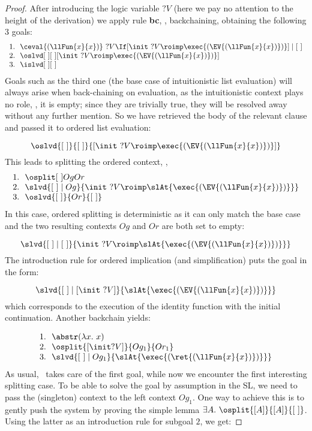 \documentclass[final]{svjour3}
\begin{document}
\begin{proof}
  After introducing  the logic variable $?V$ (here we
  pay no attention to the height of the derivation) we apply
  rule \textbf{bc}, \ie, backchaining, obtaining the following 3
  goals:
\[
\begin{array}{l}
1.\ \  \sbc {\ceval{(\llFun{x}{x})} \ ?V} {  { [\init \ ?V\roimp\exec {(\EV
        {(\llFun{x}{x})})}]}}{ \elist}\\
2.\ \ \oslvd \elist \elist { { [\init \ ?V\roimp\exec {(\EV
        {(\llFun{x}{x})})}]}}\\
3.\ \ \islvd \elist  \elist
\end{array}
\]
Goals such as the third one (the base case of intuitionistic list
evaluation) will always arise when back-chaining on evaluation, as the
intuitionistic context plays no role, \ie, it is empty; since they are
trivially true, they will be resolved away without any further
mention.  So we have retrieved the body of the relevant clause and
passed it to ordered list evaluation:

 
 $$\oslvd {\elist} {\elist} { [\init \ ?V\roimp\exec {(\EV
        {(\llFun{x}{x})})}]}  $$
This leads to   splitting  the ordered context, \ie,
\[
\begin{array}{l}
1.\ \  \osplit \elist { Og} { Or}\\
2. \ \ \slvd {\elist\coln  Og} { \init \ ?V\roimp\slAt{\exec {(\EV
      {(\llFun{x}{x})})}}} \\
3. \ \ \oslvd {\elist}{Or}{\elist}
\end{array}
\]
In this case, ordered splitting is deterministic as it can only match
the base case and the two resulting
contexts $ Og$ and ${ Or}$ are both set to  empty:


 $$\slvd {\elist\coln\elist} { \init \ ?V\roimp\slAt{\exec {(\EV
       {(\llFun{x}{x})})}}} $$
The introduction rule for ordered implication (and simplification) puts
the goal in the form:

 $$\slvd {\elist\coln [\init \ ?V]} {\slAt{\exec {(\EV
        {(\llFun{x}{x})})}}} $$
which  corresponds to the execution of the identity function with the
initial continuation. Another backchain yields:

\[
\begin{array}{l}
1. \ \ \abstr (\lambda x.\ x)\\
2. \ \  \osplit {[\init ?V]} { Og_{1}} { Or_{1}}\\
3. \ \ \slvd{\elist\coln { Og_{1}}} {\slAt{\exec {(\ret
       {(\llFun{x}{x})})}}} 
\end{array}
\]
As usual,  \ takes care of the first goal, while now
we encounter the first interesting splitting case. To be able to solve
the goal by assumption in the SL, we need to pass the (singleton)
context to the left context $ Og_1$. One way to achieve this is to
gently push the system  by  proving  the simple
lemma $\exists A.\ \osplit {[A]}{[A]}{\elist}$. Using the latter as an
introduction  rule for subgoal $2$, we get:


\end{proof}
\end{document}
